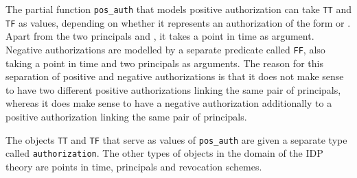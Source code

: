 \documentclass[runningheads]{llncs}
\begin{document}
The partial function \texttt{pos\_{}auth} that models positive authorization can take \texttt{TT} and \texttt{TF} as values, depending on whether it represents an authorization of the form  or . Apart from the two principals  and , it takes a point in time as argument. Negative authorizations are modelled by a separate predicate called \texttt{FF}, also taking a point in time and two principals as arguments. The reason for this separation of positive and negative authorizations is that it does not make sense to have two different positive authorizations linking the same pair of principals, whereas it does make sense to have a negative authorization additionally to a positive authorization linking the same pair of principals.

The objects \texttt{TT} and \texttt{TF} that serve as values of \texttt{pos\_{}auth} are given a separate type called \texttt{authorization}. The other types of objects in the domain of the IDP theory are points in time, principals and revocation schemes.
\end{document}
